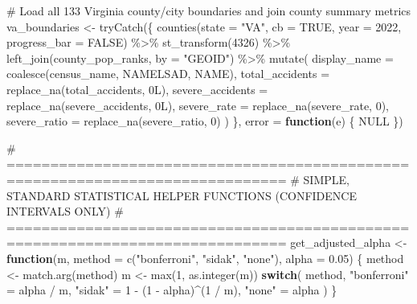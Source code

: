 \documentclass[
  letterpaper,
  DIV=11,
  numbers=noendperiod]{scrartcl}
\newenvironment{Shaded}{\begin{snugshade}}{\end{snugshade}}
\newcommand{\AttributeTok}[1]{\textcolor[rgb]{0.40,0.45,0.13}{#1}}
\newcommand{\CommentTok}[1]{\textcolor[rgb]{0.37,0.37,0.37}{#1}}
\newcommand{\ConstantTok}[1]{\textcolor[rgb]{0.56,0.35,0.01}{#1}}
\newcommand{\ControlFlowTok}[1]{\textcolor[rgb]{0.00,0.23,0.31}{\textbf{#1}}}
\newcommand{\DecValTok}[1]{\textcolor[rgb]{0.68,0.00,0.00}{#1}}
\newcommand{\FloatTok}[1]{\textcolor[rgb]{0.68,0.00,0.00}{#1}}
\newcommand{\FunctionTok}[1]{\textcolor[rgb]{0.28,0.35,0.67}{#1}}
\newcommand{\NormalTok}[1]{\textcolor[rgb]{0.00,0.23,0.31}{#1}}
\newcommand{\OtherTok}[1]{\textcolor[rgb]{0.00,0.23,0.31}{#1}}
\newcommand{\SpecialCharTok}[1]{\textcolor[rgb]{0.37,0.37,0.37}{#1}}
\newcommand{\StringTok}[1]{\textcolor[rgb]{0.13,0.47,0.30}{#1}}
\newcounter{none} %
\begin{document}
\begin{Shaded}
\begin{Highlighting}[]
\CommentTok{\# Load all 133 Virginia county/city boundaries and join county summary metrics}
\NormalTok{va\_boundaries }\OtherTok{\textless{}{-}} \FunctionTok{tryCatch}\NormalTok{(\{}
  \FunctionTok{counties}\NormalTok{(}\AttributeTok{state =} \StringTok{"VA"}\NormalTok{, }\AttributeTok{cb =} \ConstantTok{TRUE}\NormalTok{, }\AttributeTok{year =} \DecValTok{2022}\NormalTok{, }\AttributeTok{progress\_bar =} \ConstantTok{FALSE}\NormalTok{) }\SpecialCharTok{\%\textgreater{}\%}
    \FunctionTok{st\_transform}\NormalTok{(}\DecValTok{4326}\NormalTok{) }\SpecialCharTok{\%\textgreater{}\%}
    \FunctionTok{left\_join}\NormalTok{(county\_pop\_ranks, }\AttributeTok{by =} \StringTok{"GEOID"}\NormalTok{) }\SpecialCharTok{\%\textgreater{}\%}
    \FunctionTok{mutate}\NormalTok{(}
      \AttributeTok{display\_name     =} \FunctionTok{coalesce}\NormalTok{(census\_name, NAMELSAD, NAME),}
      \AttributeTok{total\_accidents  =} \FunctionTok{replace\_na}\NormalTok{(total\_accidents, }\DecValTok{0}\NormalTok{L),}
      \AttributeTok{severe\_accidents =} \FunctionTok{replace\_na}\NormalTok{(severe\_accidents, }\DecValTok{0}\NormalTok{L),}
      \AttributeTok{severe\_rate      =} \FunctionTok{replace\_na}\NormalTok{(severe\_rate, }\DecValTok{0}\NormalTok{),}
      \AttributeTok{severe\_ratio     =} \FunctionTok{replace\_na}\NormalTok{(severe\_ratio, }\DecValTok{0}\NormalTok{)}
\NormalTok{    )}
\NormalTok{\}, }\AttributeTok{error =} \ControlFlowTok{function}\NormalTok{(e) \{}
  \ConstantTok{NULL}
\NormalTok{\})}

\CommentTok{\# ==============================================================================}
\CommentTok{\# SIMPLE, STANDARD STATISTICAL HELPER FUNCTIONS (CONFIDENCE INTERVALS ONLY)}
\CommentTok{\# ==============================================================================}
\NormalTok{get\_adjusted\_alpha }\OtherTok{\textless{}{-}} \ControlFlowTok{function}\NormalTok{(m, }\AttributeTok{method =} \FunctionTok{c}\NormalTok{(}\StringTok{"bonferroni"}\NormalTok{, }\StringTok{"sidak"}\NormalTok{, }\StringTok{"none"}\NormalTok{), }\AttributeTok{alpha =} \FloatTok{0.05}\NormalTok{) \{}
\NormalTok{  method }\OtherTok{\textless{}{-}} \FunctionTok{match.arg}\NormalTok{(method)}
\NormalTok{  m }\OtherTok{\textless{}{-}} \FunctionTok{max}\NormalTok{(}\DecValTok{1}\NormalTok{, }\FunctionTok{as.integer}\NormalTok{(m))}
  \ControlFlowTok{switch}\NormalTok{(}
\NormalTok{    method,}
    \StringTok{"bonferroni"} \OtherTok{=}\NormalTok{ alpha }\SpecialCharTok{/}\NormalTok{ m,}
    \StringTok{"sidak"}      \OtherTok{=} \DecValTok{1} \SpecialCharTok{{-}}\NormalTok{ (}\DecValTok{1} \SpecialCharTok{{-}}\NormalTok{ alpha)}\SpecialCharTok{\^{}}\NormalTok{(}\DecValTok{1} \SpecialCharTok{/}\NormalTok{ m),}
    \StringTok{"none"}       \OtherTok{=}\NormalTok{ alpha}
\NormalTok{  )}
\NormalTok{\}}


\end{Highlighting}
\end{Shaded}
\end{document}
